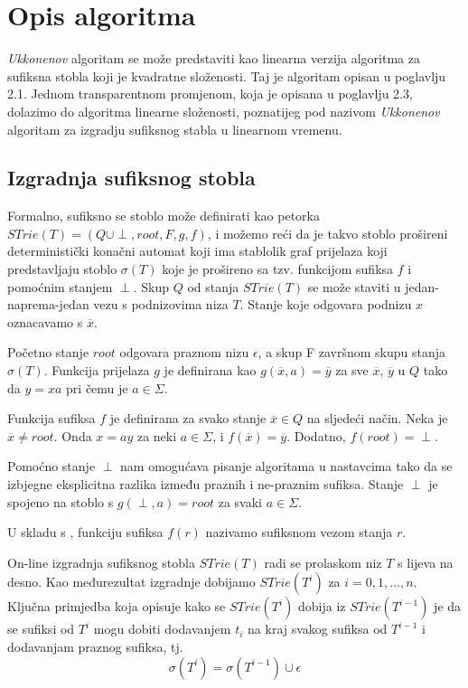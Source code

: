 \documentclass[times, utf8, seminar, numeric]{fer}
\begin{document}
\chapter{Opis algoritma}
	\textit{Ukkonenov} algoritam se može predstaviti kao linearna verzija algoritma za sufiksna stobla koji je kvadratne složenosti. Taj je algoritam opisan u poglavlju 2.1. Jednom transparentnom promjenom, koja je opisana u poglavlju 2.3, dolazimo do algoritma linearne složenosti, poznatijeg pod nazivom \textit{Ukkonenov} algoritam za izgradju sufiksnog stabla u linearnom vremenu.

\section{Izgradnja sufiksnog stobla}
	Formalno, sufiksno se stoblo može definirati kao petorka $STrie(T) = (Q \cup {\perp}, root, F, g, f)$, i možemo reći da je takvo stoblo prošireni deterministički konačni automat koji ima stablolik graf prijelaza koji predstavljaju stoblo $\sigma(T)$ koje je prošireno sa tzv. funkcijom sufiksa  $f$ i pomoćnim stanjem $\perp$. Skup $Q$ od stanja $STrie(T)$ se može staviti u jedan-naprema-jedan vezu s podnizovima niza $T$. Stanje koje odgovara podnizu $x$ oznacavamo s $\overline{x}$.
	
	Početno stanje $root$ odgovara praznom nizu $\epsilon$, a skup F završnom skupu stanja  $\sigma(T)$. Funkcija prijelaza $g$ je definirana kao $g(\overline{x}, a) = \overline{y}$ za sve $\overline{x}$, $\overline{y}$ u $Q$ tako da $y = x a$ pri čemu je $a \in \Sigma$.
	
	Funkcija sufiksa $f$ je definirana za svako stanje $\overline{x} \in Q$ na sljedeći način. Neka je $\overline{x} \ne root$. Onda $x = ay$ za neki $a \in \Sigma$, i $f(\overline{x}) = \overline{y}$. Dodatno, $f(root) = \perp$.
	
	Pomoćno stanje $\perp$ nam omogućava pisanje algoritama u nastavcima tako da se izbjegne eksplicitna razlika između praznih i ne-praznim sufiksa. Stanje $\perp$ je spojeno na stoblo s $g(\perp, a) = root$ za svaki $a \in \Sigma$. 
	
	U skladu s \cite{ukkonen}, funkciju sufiksa $f(r)$ nazivamo sufiksnom vezom  stanja $r$. 
	
	On-line izgradnja sufiksnog stobla $STrie(T)$ radi se prolaskom niz $T$ s lijeva na desno. Kao međurezultat izgradnje dobijamo $STrie(T^i)$ za $i=0, 1, ..., n$. 
	Ključna primjedba koja opisuje kako se $STrie(T^i)$ dobija iz $STrie(T^{i-1})$ je da se sufiksi od $T^i$ mogu dobiti dodavanjem $t_i$ na kraj svakog sufiksa od $T^{i-1}$ i dodavanjam praznog sufiksa, tj. $$ \sigma(T^i) = \sigma(T^{i-1}) \cup {\epsilon}$$
	
\end{document}
